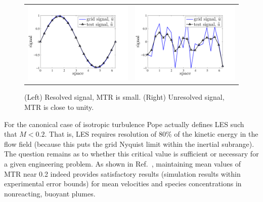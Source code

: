 \documentclass[11pt]{book}
\begin{document}
\begin{figure}[ht]
\centering
\begin{tabular}{rl}
\includegraphics[width=3.2in]{FIGURES/mtr_resolved_signal} &
\includegraphics[width=3.2in]{FIGURES/mtr_unresolved_signal}
\end{tabular}
\vskip-0.2cm
\caption[Examples of the measure of turbulence resolution]{(Left) Resolved signal, MTR is small. (Right) Unresolved signal, MTR is close to unity.}
\label{fig_mtr}
\end{figure}

For the canonical case of isotropic turbulence Pope actually defines LES such that $M<0.2$.  That is, LES requires resolution of 80\% of the kinetic energy in the flow field (because this puts the grid Nyquist limit within the inertial subrange).  The question remains as to whether this critical value is sufficient or necessary for a given engineering problem.  As shown in Ref.~\cite{McDermott:2010}, maintaining mean values of MTR near 0.2 indeed provides satisfactory results (simulation results within experimental error bounds) for mean velocities and species concentrations in nonreacting, buoyant plumes.
\end{document}
